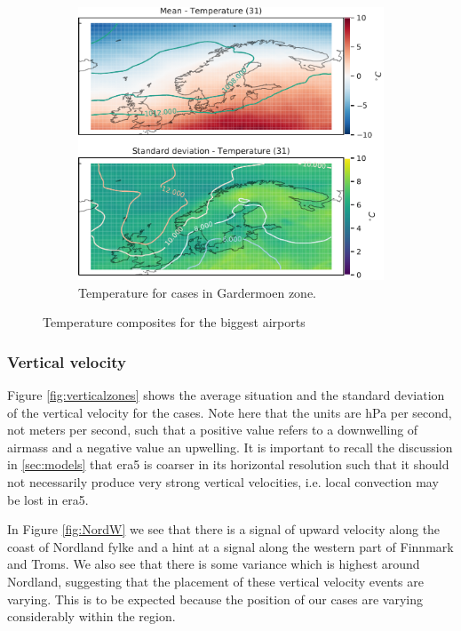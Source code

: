 \begin{figure}
    \begin{subfigure}[b]{0.5\textwidth}
    \centering
    \includegraphics[width=\textwidth]{Figures/TempENGM.pdf}
    \caption{Temperature for cases in Gardermoen zone.}
    \label{fig:ENGMTemperature}
\end{subfigure}
\caption{Temperature composites for the biggest airports}
\label{fig:tempairports}
\end{figure}

\subsubsection{Vertical velocity}

Figure \ref{fig:verticalzones} shows the average situation and the standard deviation of the vertical velocity for the cases. Note here that the units are hPa per second, not meters per second, such that a positive value refers to a downwelling of airmass and a negative value an upwelling. It is important to recall the discussion in \ref{sec:models} that \acrshort{era5} is coarser in its horizontal resolution such that it should not necessarily produce very strong vertical velocities, i.e. local convection may be lost in \acrshort{era5}.

In Figure \ref{fig:NordW} we see that there is a signal of upward velocity along the coast of Nordland fylke and a hint at a signal along the western part of Finnmark and Troms. We also see that there is some variance which is highest around Nordland, suggesting that the placement of these vertical velocity events are varying. This is to be expected because the position of our cases are varying considerably within the region.

